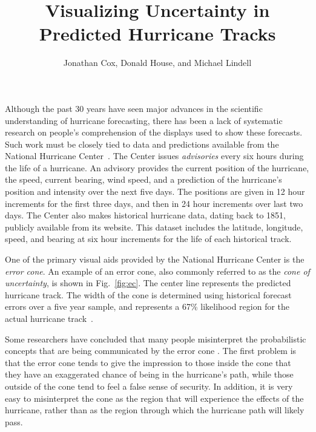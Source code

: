 \documentclass[journal]{vgtc}                %
\title{Visualizing Uncertainty in Predicted Hurricane Tracks}
\author{Jonathan Cox, Donald House, and Michael Lindell}
\begin{document}
\maketitle





Although the past 30 years have seen major advances in the scientific understanding of hurricane forecasting, there has been a lack of systematic research on people's comprehension of the displays used to show these forecasts.  Such work must be closely tied to data and predictions available from the National Hurricane Center~\cite{NHC:2008:PA}. The Center issues {\em advisories} every six hours during the life of a hurricane.
An advisory provides the current position of the hurricane, the speed, current bearing, wind speed, and a prediction of the hurricane's position and intensity over the next five days.  The positions are given in 12 hour increments for the first three days, and then in 24 hour increments over last two days.
The Center also makes historical hurricane data, dating back to 1851, publicly available from its website.  
This dataset includes the latitude, longitude, speed, and bearing at six hour increments for the life of each historical track.

One of the primary visual aids provided by the National Hurricane Center is the {\em error cone}.  An example of an error cone, also commonly referred to as the {\em cone of uncertainty}, is shown in Fig.~\ref{fig:ec}.  The center line represents the predicted hurricane track.  The width of the cone is determined using historical forecast errors over a five year sample, and represents a 67\% likelihood region for the actual hurricane track~\cite{NHC:2011:DTRC}.

Some researchers have concluded that many people misinterpret the 
probabilistic concepts that are being communicated by the error cone \cite{Broad:007:MCOUF}.   
The first problem is that the error cone tends to give the impression to those inside the cone that they have an exaggerated chance of being in the hurricane's path, while those outside of the cone tend to feel a false sense of security. In addition, it is very easy to
misinterpret the cone as the region that will experience the effects of the hurricane, rather than as the region 
through which the hurricane path will likely pass.
\end{document}
